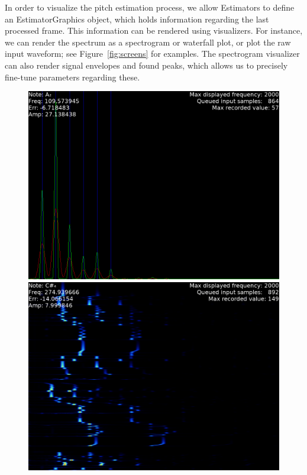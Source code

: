 \documentclass[a4paper,10pt,twocolumn]{article}
\begin{document}
In order to visualize the pitch estimation process, we allow Estimators to define an EstimatorGraphics object, which holds information regarding the last processed frame. This information can be rendered using visualizers. For instance, we can render the spectrum as a spectrogram or waterfall plot, or plot the raw input waveform; see Figure~\ref{fig:screens} for examples. The spectrogram visualizer can also render signal envelopes and found peaks, which allows us to precisely fine-tune parameters regarding these.
\begin{figure}[h]
    \centering
        \includegraphics[width=\linewidth]{fig/digi_spec.png}
        \includegraphics[width=\linewidth]{fig/digi_water.png}

\end{figure}
\end{document}
